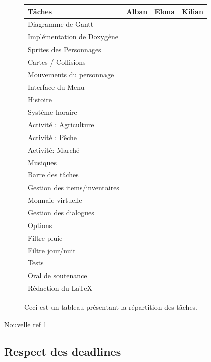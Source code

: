 \documentclass{article}
\newcommand{\Tache}{\cellcolor{blue!25}}
\begin{document}
\begin{figure}[h]
\begin{tabular}{|l|c|c|c|}
Tâches & Alban & Elona & Kilian \\
\hline
Diagramme de Gantt &\Tache  &   \Tache  &     \\
Implémentation de Doxygène &    &   &    \Tache  \\
Sprites des Personnages &    &  \Tache&     \\
Cartes / Collisions & \Tache   &    &     \\%
Mouvements du personnage &    &  &  \Tache    \\
Interface du Menu &    &    \Tache  & \Tache\\%
Histoire &\Tache    &     &\\
Système horaire &    &    &   \Tache    \\
Activité : Agriculture &    &     &    \Tache    \\
Activité : Pêche &\Tache &  &  \Tache    \\%
Activité: Marché &    &\Tache &  \Tache    \\%
Musiques &\Tache    & \Tache  &\Tache  \\%
Barre des tâches &\Tache  &     &     \\
Gestion des items/inventaires &    &  &\Tache    \\
Monnaie virtuelle &    &  &\Tache    \\
Gestion des dialogues &    &  &\Tache    \\
Options &    &\Tache  &   \\%
Filtre pluie &\Tache    &\Tache  &\Tache  \\
Filtre jour/nuit &\Tache    &\Tache  &\Tache  \\
Tests & \Tache   & \Tache &\Tache    \\
Oral de soutenance & \Tache   & \Tache &\Tache    \\ %
Rédaction du \LaTeX &\Tache    &\Tache  &\Tache    \\%


\end{tabular}
\caption{Ceci est un tableau présentant la répartition des tâches.}\label{f1}
\end{figure}

Nouvelle ref \ref{f1}



\subsection{Respect des deadlines}
\end{document}
